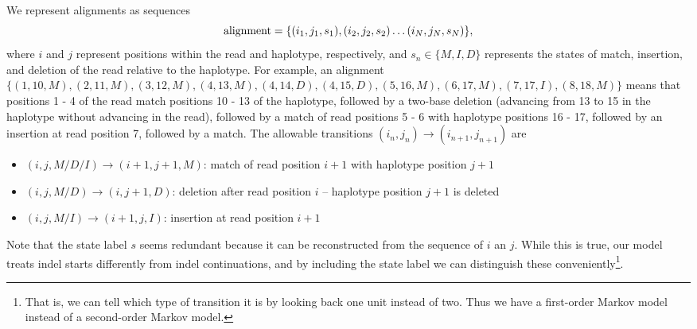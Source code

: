 \documentclass[nofootinbib,amssymb,amsmath]{revtex4}
\begin{document}
We represent alignments as sequences
\begin{equation}
{\rm alignment} = \{ (i_1, j_1, s_1), (i_2, j_2, s_2) \ldots (i_N, j_N, s_N) \},
\end{equation}
where $i$ and $j$ represent positions within the read and haplotype, respectively, and $s_n \in \{ M, I, D \}$ represents the states of match, insertion, and deletion of the read relative to the haplotype.  For example, an alignment $\{ (1,10, M), (2,11, M), (3,12, M), (4,13, M), (4,14, D), (4,15, D), (5,16, M), (6,17, M), (7,17, I), (8,18, M) \}$ means that positions 1 - 4 of the read match positions 10 - 13 of the haplotype, followed by a two-base deletion (advancing from 13 to 15 in the haplotype without advancing in the read), followed by a match of read positions 5 - 6 with haplotype positions 16 - 17, followed by an insertion at read position 7, followed by a match.  The allowable transitions $(i_n, j_n) \rightarrow (i_{n+1}, j_{n+1})$ are
\begin{itemize}
\item $(i, j, M/D/I) \rightarrow (i+1, j+1, M)$: match of read position $i+1$ with haplotype position $j + 1$
\item $(i, j, M/D) \rightarrow (i, j+1, D)$: deletion after read position $i$ -- haplotype position $j+1$ is deleted
\item $(i, j, M/I) \rightarrow (i + 1, j, I)$: insertion at read position $i + 1$
\end{itemize}
Note that the state label $s$ seems redundant because it can be reconstructed from the sequence of $i$ an $j$.  While this is true, our model treats indel starts differently from indel continuations, and by including the state label we can distinguish these conveniently\footnote{That is, we can tell which type of transition it is by looking back one unit instead of two.  Thus we have a first-order Markov model instead of a second-order Markov model.}.
\end{document}
